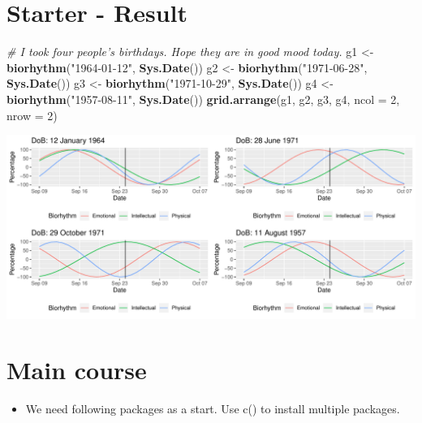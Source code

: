 \documentclass[]{article}
\newenvironment{Shaded}{\begin{snugshade}}{\end{snugshade}}
\newcommand{\CommentTok}[1]{\textcolor[rgb]{0.56,0.35,0.01}{\textit{#1}}}
\newcommand{\DataTypeTok}[1]{\textcolor[rgb]{0.13,0.29,0.53}{#1}}
\newcommand{\DecValTok}[1]{\textcolor[rgb]{0.00,0.00,0.81}{#1}}
\newcommand{\KeywordTok}[1]{\textcolor[rgb]{0.13,0.29,0.53}{\textbf{#1}}}
\newcommand{\NormalTok}[1]{#1}
\newcommand{\StringTok}[1]{\textcolor[rgb]{0.31,0.60,0.02}{#1}}
\providecommand{\tightlist}{%
  \setlength{\itemsep}{0pt}\setlength{\parskip}{0pt}}
\begin{document}
\hypertarget{starter---result}{%
\section{Starter - Result}\label{starter---result}}

\begin{Shaded}
\begin{Highlighting}[]
\CommentTok{# I took four people's birthdays. Hope they are in good mood today.}
\NormalTok{g1 <-}\StringTok{ }\KeywordTok{biorhythm}\NormalTok{(}\StringTok{"1964-01-12"}\NormalTok{, }\KeywordTok{Sys.Date}\NormalTok{())}
\NormalTok{g2 <-}\StringTok{ }\KeywordTok{biorhythm}\NormalTok{(}\StringTok{"1971-06-28"}\NormalTok{, }\KeywordTok{Sys.Date}\NormalTok{())}
\NormalTok{g3 <-}\StringTok{ }\KeywordTok{biorhythm}\NormalTok{(}\StringTok{"1971-10-29"}\NormalTok{, }\KeywordTok{Sys.Date}\NormalTok{())}
\NormalTok{g4 <-}\StringTok{ }\KeywordTok{biorhythm}\NormalTok{(}\StringTok{"1957-08-11"}\NormalTok{, }\KeywordTok{Sys.Date}\NormalTok{())}
\KeywordTok{grid.arrange}\NormalTok{(g1, g2, g3, g4, }\DataTypeTok{ncol =} \DecValTok{2}\NormalTok{, }\DataTypeTok{nrow =} \DecValTok{2}\NormalTok{)}
\end{Highlighting}
\end{Shaded}

\begin{center}\includegraphics{lec13_files/figure-latex/unnamed-chunk-3-1} \end{center}

\hypertarget{main-course}{%
\section{Main course}\label{main-course}}

\begin{itemize}
\tightlist
\item
  We need following packages as a start. Use c() to install multiple
  packages.
\end{itemize}
\end{document}
